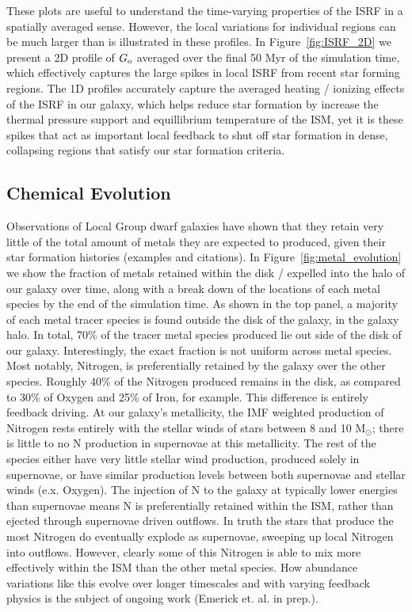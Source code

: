\documentclass[twocolumn]{aastex61}
\begin{document}
These plots are useful to understand the time-varying properties of the ISRF in a spatially averaged sense. However, the local variations for individual regions can be much larger than is illustrated in these profiles. In Figure~\ref{fig:ISRF_2D} we present a 2D profile of $G_{\rm o}$ averaged over the final 50 Myr of the simulation time, which effectively captures the large spikes in local ISRF from recent star forming regions. The 1D profiles accurately capture the averaged heating / ionizing effects of the ISRF in our galaxy, which helps reduce star formation by increase the thermal pressure support and equillibrium temperature of the ISM, yet it is these spikes that act as important local feedback to shut off star formation in dense, collapsing regions that satisfy our star formation criteria.

\subsection{Chemical Evolution} 
\label{sec:chemical evolution}
Observations of Local Group dwarf galaxies have shown that they retain very little of the total amount of metals they are expected to produced, given their star formation histories (examples and citations). In Figure~\ref{fig:metal_evolution} we show the fraction of metals retained within the disk / expelled into the halo of our galaxy over time, along with a break down of the locations of each metal species by the end of the simulation time. As shown in the top panel, a majority of each metal tracer species is found outside the disk of the galaxy, in the galaxy halo. In total, 70\% of the tracer metal species produced lie out side of the disk of our galaxy. Interestingly, the exact fraction is not uniform across metal species. Most notably, Nitrogen, is preferentially retained by the galaxy over the other species. Roughly 40\% of the Nitrogen produced remains in the disk, as compared to 30\% of Oxygen and 25\% of Iron, for example. This difference is entirely feedback driving. At our galaxy's metallicity, the IMF weighted production of Nitrogen rests entirely with the stellar winds of stars between 8 and 10 M$_{\odot}$; there is little to no N production in supernovae at this metallicity. The rest of the species either have very little stellar wind production, produced solely in supernovae, or have similar production levels between both supernovae and stellar winds (e.x. Oxygen). The injection of N to the galaxy at typically lower energies than supernovae means N is preferentially retained within the ISM, rather than ejected through supernovae driven outflows. In truth the stars that produce the most Nitrogen do eventually explode as supernovae, sweeping up local Nitrogen into outflows. However, clearly some of this Nitrogen is able to mix more effectively within the ISM than the other metal species. How abundance variations like this evolve over longer timescales and with varying feedback physics is the subject of ongoing work (Emerick et. al. in prep.). 
\end{document}
